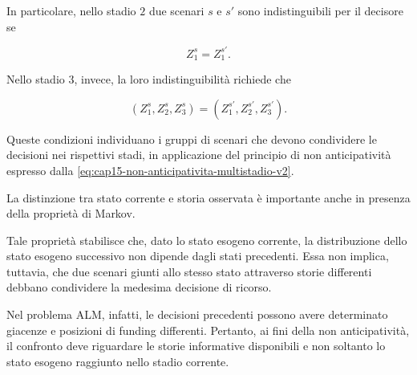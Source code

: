 In particolare, nello stadio $2$
due scenari $s$ e $s'$ sono
indistinguibili per il decisore se

\[
Z_1^s=Z_1^{s'}.
\]

Nello stadio $3$, invece,
la loro indistinguibilit\`{a}
richiede che

\[
(Z_1^s,Z_2^s,Z_3^s)
=
(Z_1^{s'},Z_2^{s'},Z_3^{s'}).
\]

Queste condizioni individuano
i gruppi di scenari che devono
condividere le decisioni nei
rispettivi stadi, in applicazione
del principio di non anticipativit\`{a}
espresso dalla
\eqref{eq:cap15-non-anticipativita-multistadio-v2}.

La distinzione tra stato corrente
e storia osservata \`{e} importante
anche in presenza della propriet\`{a}
di Markov.

Tale propriet\`{a} stabilisce che,
dato lo stato esogeno corrente,
la distribuzione dello stato
esogeno successivo non dipende
dagli stati precedenti.
Essa non implica, tuttavia,
che due scenari giunti allo stesso
stato attraverso storie differenti
debbano condividere la medesima
decisione di ricorso.

Nel problema ALM, infatti,
le decisioni precedenti possono
avere determinato giacenze
e posizioni di funding differenti.
Pertanto, ai fini della
non anticipativit\`{a},
il confronto deve riguardare
le storie informative disponibili
e non soltanto lo stato esogeno
raggiunto nello stadio corrente.










